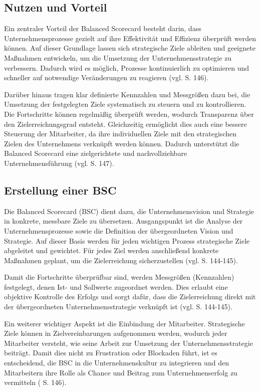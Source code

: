 \subsection{Nutzen und Vorteil}
Ein zentraler Vorteil der Balanced Scorecard besteht darin, dass Unternehmensprozesse gezielt auf ihre Effektivität und Effizienz überprüft werden können. Auf dieser Grundlage lassen sich strategische Ziele ableiten und geeignete Maßnahmen entwickeln, um die Umsetzung der Unternehmensstrategie zu verbessern. Dadurch wird es möglich, Prozesse kontinuierlich zu optimieren und schneller auf notwendige Veränderungen zu reagieren (vgl. \cite{hans_von_2013} S. 146).

Darüber hinaus tragen klar definierte Kennzahlen und Messgrößen dazu bei, die Umsetzung der festgelegten Ziele systematisch zu steuern und zu kontrollieren. Die Fortschritte können regelmäßig überprüft werden, wodurch Transparenz über den Zielerreichungsgrad entsteht. Gleichzeitig ermöglicht dies auch eine bessere Steuerung der Mitarbeiter, da ihre individuellen Ziele mit den strategischen Zielen des Unternehmens verknüpft werden können. Dadurch unterstützt die Balanced Scorecard eine zielgerichtete und nachvollziehbare Unternehmensführung (vgl. \cite{hans_von_2013} S. 147).

\subsection{Erstellung einer BSC}
Die Balanced Scorecard (BSC) dient dazu, die Unternehmensvision und Strategie in konkrete, messbare Ziele zu übersetzen. Ausgangspunkt ist die Analyse der Unternehmensprozesse sowie die Definition der übergeordneten Vision und Strategie. Auf dieser Basis werden für jeden wichtigen Prozess strategische Ziele abgeleitet und gewichtet. Für jedes Ziel werden anschließend konkrete Maßnahmen geplant, um die Zielerreichung sicherzustellen (vgl. \cite{hans_von_2013} S. 144-145).

Damit die Fortschritte überprüfbar sind, werden Messgrößen (Kennzahlen) festgelegt, denen Ist- und Sollwerte zugeordnet werden. Dies erlaubt eine objektive Kontrolle des Erfolgs und sorgt dafür, dass die Zielerreichung direkt mit der übergeordneten Unternehmensstrategie verknüpft ist (vgl. \cite{hans_von_2013} S. 144-145).

Ein weiterer wichtiger Aspekt ist die Einbindung der Mitarbeiter. Strategische Ziele können in Zielvereinbarungen aufgenommen werden, wodurch jeder Mitarbeiter versteht, wie seine Arbeit zur Umsetzung der Unternehmensstrategie beiträgt. Damit dies nicht zu Frustration oder Blockaden führt, ist es entscheidend, die BSC in die Unternehmenskultur zu integrieren und den Mitarbeitern ihre Rolle als Chance und Beitrag zum Unternehmenserfolg zu vermitteln (\cite{hans_von_2013} S. 146).


